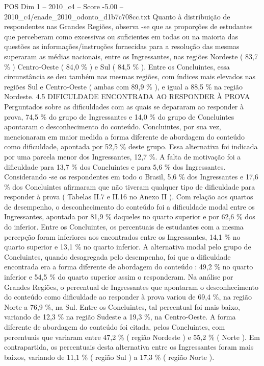 \begin{textsample}{POS Dim 1 – 2010\_c4 – Score -5.00 – 2010\_c4/enade\_2010\_odonto\_d1b7c708cc.txt}
Quanto à distribuição de respondentes nas Grandes Regiões, observa -se que as proporções de estudantes que perceberam como excessivas ou suficientes em todas ou na maioria das questões as informações/instruções fornecidas para a resolução das mesmas superaram as médias nacionais, entre os Ingressantes, nas regiões Nordeste ( 83,7 \% ) Centro-Oeste ( 84,0 \% ) e Sul ( 84,5 \% ).
Entre os Concluintes, essa circunstância se deu também nas mesmas regiões, com índices mais elevados nas regiões Sul e Centro-Oeste ( ambas com 89,9 \% ), e igual a 88,5 \% na região Nordeste. 4.5 DIFICULDADE ENCONTRADA AO RESPONDER À PROVA Perguntados sobre as dificuldades com as quais se depararam ao responder à prova, 74,5 \% do grupo de Ingressantes e 14,0 \% do grupo de Concluintes apontaram o desconhecimento do conteúdo.
Concluintes, por sua vez, mencionaram em maior medida a forma diferente de abordagem do conteúdo como dificuldade, apontada por 52,5 \% deste grupo.
Essa alternativa foi indicada por uma parcela menor dos Ingressantes, 12,7 \%.
A falta de motivação foi a dificuldade para 13,7 \% dos Concluintes e para 5,6 \% dos Ingressantes.
Considerando -se os respondentes em todo o Brasil, 5,6 \% dos Ingressantes e 17,6 \% dos Concluintes afirmaram que não tiveram qualquer tipo de dificuldade para responder à prova ( Tabelas II.7 e II.16 no Anexo II ).
Com relação aos quartos de desempenho, o desconhecimento do conteúdo foi a dificuldade modal entre os Ingressantes, apontada por 81,9 \% daqueles no quarto superior e por 62,6 \% dos do inferior.
Entre os Concluintes, os percentuais de estudantes com a mesma percepção foram inferiores aos encontrados entre os Ingressantes, 14,1 \% no quarto superior e 13,1 \% no quarto inferior.
A alternativa modal pelo grupo de Concluintes, quando desagregada pelo desempenho, foi que a dificuldade encontrada era a forma diferente de abordagem do conteúdo : 49,2 \% no quarto inferior e 54,5 \% do quarto superior assim o responderam.
Na análise por Grandes Regiões, o percentual de Ingressantes que apontaram o desconhecimento do conteúdo como dificuldade ao responder à prova variou de 69,4 \%, na região Norte a 76,9 \%, na Sul.
Entre os Concluintes, tal percentual foi mais baixo, variando de 12,3 \% na região Sudeste a 19,3 \%, na Centro-Oeste.
A forma diferente de abordagem do conteúdo foi citada, pelos Concluintes, com percentuais que variaram entre 47,2 \% ( região Nordeste ) e 55,2 \% ( Norte ).
Em contrapartida, os percentuais desta alternativa entre os Ingressantes foram mais baixos, variando de 11,1 \% ( região Sul ) a 17,3 \% ( região Norte ).

\end{textsample}
